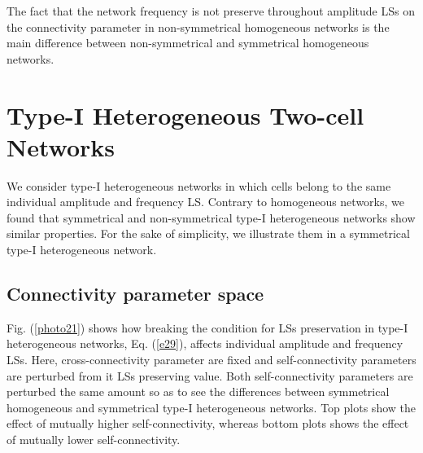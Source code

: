 The fact that the network frequency is not preserve throughout amplitude LSs on the connectivity parameter in non-symmetrical homogeneous networks is the main difference between non-symmetrical and symmetrical homogeneous networks.

\section{Type-\textrm{I} Heterogeneous Two-cell Networks}
We consider type-\textrm{I} heterogeneous networks in which cells belong to the same individual amplitude and frequency LS. Contrary to homogeneous networks, we found that symmetrical and non-symmetrical type-\textrm{I} heterogeneous networks show similar properties. For the sake of simplicity, we illustrate them in a symmetrical type-\textrm{I} heterogeneous network.

\subsection{Connectivity parameter space}

Fig. (\ref{photo21}) shows how breaking the condition for LSs preservation in type-\textrm{I} heterogeneous networks, Eq. (\ref{e29}), affects individual amplitude and frequency LSs. Here, cross-connectivity parameter are fixed and self-connectivity parameters are perturbed from it LSs preserving value. Both self-connectivity parameters are perturbed the same amount so as to see the differences between symmetrical homogeneous and symmetrical type-\textrm{I} heterogeneous networks. Top plots show the effect of mutually higher self-connectivity, whereas bottom plots shows the effect of mutually lower self-connectivity. 

